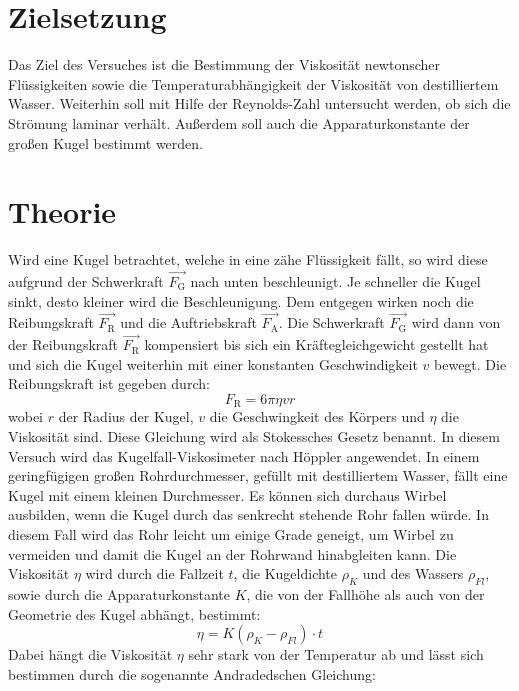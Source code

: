 \section{Zielsetzung}
\label{sec:Zielsetzung}
Das Ziel des Versuches ist die Bestimmung der Viskosität newtonscher Flüssigkeiten sowie die Temperaturabhängigkeit der Viskosität von destilliertem Wasser. 
Weiterhin soll mit Hilfe der Reynolds-Zahl untersucht werden, ob sich die Strömung laminar verhält. Außerdem soll auch die Apparaturkonstante der großen Kugel bestimmt werden.
\section{Theorie}
\label{sec:Theorie}
Wird eine Kugel betrachtet, welche in eine zähe Flüssigkeit fällt, so wird diese aufgrund der Schwerkraft $\vec{F_\text{G}}$ nach unten beschleunigt. Je schneller die Kugel sinkt, desto kleiner wird 
die Beschleunigung. Dem entgegen wirken noch die Reibungskraft $\vec{F_\text{R}}$ und die Auftriebskraft $\vec{F_\text{A}}$. Die Schwerkraft $\vec{F_\text{G}}$ wird dann von der Reibungskraft $\vec{F_\text{R}}$ 
kompensiert bis sich ein Kräftegleichgewicht gestellt hat und sich die Kugel weiterhin mit einer konstanten Geschwindigkeit $v$ bewegt.
Die Reibungskraft ist gegeben durch:
\begin{equation*}
F_\text{R} = 6\pi\eta v r
\end{equation*}
wobei $r$ der Radius der Kugel, $v$ die Geschwingkeit des Körpers und $\eta$ die Viskosität sind. 
Diese Gleichung wird als Stokessches Gesetz benannt.
In diesem Versuch wird das Kugelfall-Viskosimeter nach Höppler angewendet. In einem geringfügigen großen Rohrdurchmesser, gefüllt mit destilliertem Wasser, fällt eine Kugel mit einem kleinen Durchmesser. 
Es können sich durchaus Wirbel ausbilden, wenn die Kugel durch das senkrecht stehende Rohr fallen würde. In diesem Fall wird das Rohr leicht um einige Grade geneigt, um Wirbel zu vermeiden und damit die Kugel 
an der Rohrwand hinabgleiten kann. Die Viskosität $\eta$ wird durch die Fallzeit $t$, die Kugeldichte $\rho_{K}$ und des Wassers $\rho_{Fl}$, sowie durch die Apparaturkonstante $K$, die von der Fallhöhe als auch von der Geometrie 
des Kugel abhängt, bestimmt:
\begin{equation}
\label{eqn:Etat}
\eta=K\left(\rho_{K}-\rho_{Fl}\right)\cdot t
\end{equation}
Dabei hängt die Viskosität $\eta$ sehr stark von der Temperatur ab und lässt sich bestimmen durch die sogenannte Andradedschen Gleichung:
